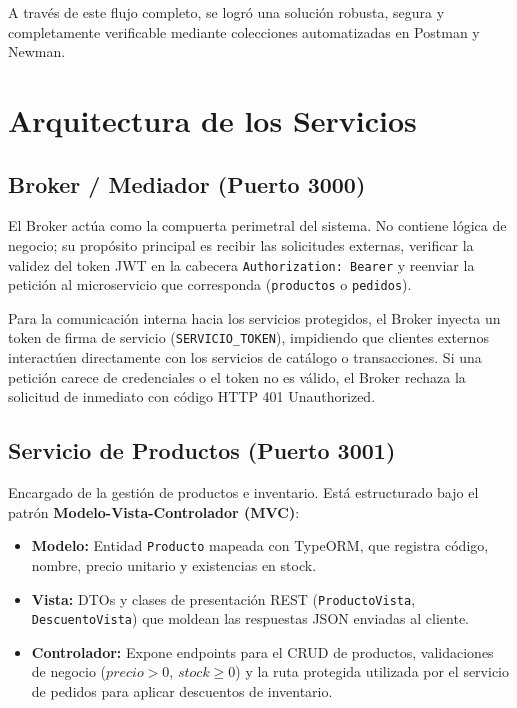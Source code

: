 \documentclass[conference]{IEEEtran}
\begin{document}
A través de este flujo completo, se logró una solución robusta, segura y completamente verificable mediante colecciones automatizadas en Postman y Newman.

\section{Arquitectura de los Servicios}

\subsection{Broker / Mediador (Puerto 3000)}
El Broker actúa como la compuerta perimetral del sistema. No contiene lógica de negocio; su propósito principal es recibir las solicitudes externas, verificar la validez del token JWT en la cabecera \texttt{Authorization: Bearer} y reenviar la petición al microservicio que corresponda (\texttt{productos} o \texttt{pedidos}).

Para la comunicación interna hacia los servicios protegidos, el Broker inyecta un token de firma de servicio (\texttt{SERVICIO\_TOKEN}), impidiendo que clientes externos interactúen directamente con los servicios de catálogo o transacciones. Si una petición carece de credenciales o el token no es válido, el Broker rechaza la solicitud de inmediato con código HTTP 401 Unauthorized.

\subsection{Servicio de Productos (Puerto 3001)}
Encargado de la gestión de productos e inventario. Está estructurado bajo el patrón \textbf{Modelo-Vista-Controlador (MVC)}:
\begin{itemize}
    \item \textbf{Modelo:} Entidad \texttt{Producto} mapeada con TypeORM, que registra código, nombre, precio unitario y existencias en stock.
    \item \textbf{Vista:} DTOs y clases de presentación REST (\texttt{ProductoVista}, \texttt{DescuentoVista}) que moldean las respuestas JSON enviadas al cliente.
    \item \textbf{Controlador:} Expone endpoints para el CRUD de productos, validaciones de negocio ($precio > 0$, $stock \ge 0$) y la ruta protegida utilizada por el servicio de pedidos para aplicar descuentos de inventario.
\end{itemize}
\end{document}
